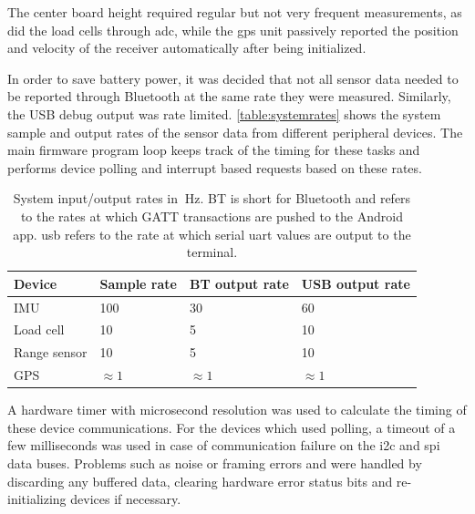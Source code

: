 The center board height required regular but not very frequent measurements, as did the load cells through \gls{adc}, while the \gls{gps} unit passively reported the position and velocity of the receiver automatically after being initialized.

In order to save battery power, it was decided that not all sensor data needed to be reported through Bluetooth at the same rate they were measured. Similarly, the USB debug output was rate limited. \autoref{table:systemrates} shows the system sample and output rates of the sensor data from different peripheral devices. The main firmware program loop keeps track of the timing for these tasks and performs device polling and interrupt based requests based on these rates.

\begin{table}[H]
\centering
\begin{tabular}{ l | l | l | l }
  Device 	& Sample rate & BT output rate 	& USB output rate\\
  \hline
  IMU 		& 100 		& 30 			& 60\\
  Load cell 	& 10 		& 5 			& 10\\
  Range sensor & 10 	& 5 			& 10\\
  GPS 		& $\approx 1$ & $\approx 1$ 	& $\approx 1$\\
\end{tabular}
\caption{System input/output rates in $~\textrm{Hz}$. BT is short for Bluetooth and refers to the rates at which GATT transactions are pushed to the Android app. \gls{usb} refers to the rate at which serial \gls{uart} values are output to the terminal.}
\label{table:systemrates}
\end{table}

A hardware timer with microsecond resolution was used to calculate the timing of these device communications. For the devices which used polling, a timeout of a few milliseconds was used in case of communication failure on the \gls{i2c} and \gls{spi} data buses. Problems such as noise or framing errors and were handled by discarding any buffered data, clearing hardware error status bits and re-initializing devices if necessary.
